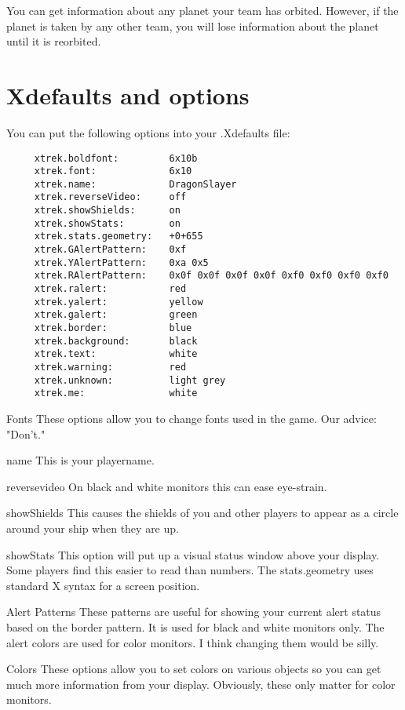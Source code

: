 You can get information about any planet your team has orbited.
However, if the planet is taken by any other team, you will
lose information about the planet until it is reorbited.


\section{Xdefaults and options}

You can put the following options into your .Xdefaults file:

\begin{verbatim}
     xtrek.boldfont:         6x10b
     xtrek.font:             6x10
     xtrek.name:             DragonSlayer
     xtrek.reverseVideo:     off
     xtrek.showShields:      on
     xtrek.showStats:        on
     xtrek.stats.geometry:   +0+655
     xtrek.GAlertPattern:    0xf
     xtrek.YAlertPattern:    0xa 0x5
     xtrek.RAlertPattern:    0x0f 0x0f 0x0f 0x0f 0xf0 0xf0 0xf0 0xf0
     xtrek.ralert:           red
     xtrek.yalert:           yellow
     xtrek.galert:           green
     xtrek.border:           blue
     xtrek.background:       black
     xtrek.text:             white
     xtrek.warning:          red
     xtrek.unknown:          light grey
     xtrek.me:               white
\end{verbatim}

\begin{list}{}{
	\renewcommand{\makelabel}[1]{{\tt #1 \hfill}}
         \setlength{\leftmargin}{2.5cm}
         \setlength{\labelwidth}{\leftmargin}
         \setlength{\labelsep}{0in}
}

\item[Fonts] These options allow you to change fonts used in the game.
              Our advice: "Don't."

\item[name] This is your playername.

\item[reversevideo] On black and white monitors this can ease eye-strain.

\item[showShields] This causes the shields of you and other players to appear
                     as a circle around your ship when they are up.

\item[showStats] This option will put up a visual status window above 
          your display.  Some players find this easier to read than numbers.
          The stats.geometry uses standard X syntax for a screen position.

\item[Alert Patterns] These patterns are useful for showing your current 
          alert status based
on the border pattern.  It is used for black and white monitors only.
The alert colors are used for color monitors.  I think changing them
would be silly.

\item[Colors] These options allow you to set colors on various objects
so you can get much more information from your display.
Obviously, these only matter for color monitors.
\end{list}


